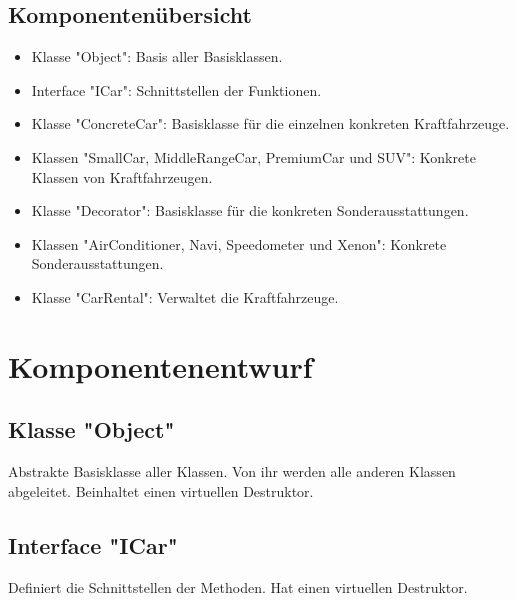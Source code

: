 \documentclass[12pt,a4paper]{article}
\begin{document}
\subsection {Komponentenübersicht}
\begin {itemize} 
	\item Klasse "Object":
	\newline
	Basis aller Basisklassen.
	
	\item Interface "ICar":
	\newline
	Schnittstellen der Funktionen.

	\item Klasse "ConcreteCar":
	\newline
	Basisklasse für die einzelnen konkreten Kraftfahrzeuge.

	\item Klassen "SmallCar, MiddleRangeCar, PremiumCar und SUV":
	\newline
	Konkrete Klassen von Kraftfahrzeugen.

	\item Klasse "Decorator":
	\newline
	Basisklasse für die konkreten Sonderausstattungen.
	
	\item Klassen "AirConditioner, Navi, Speedometer und Xenon":
	\newline
	Konkrete Sonderausstattungen.

	\item Klasse "CarRental":
	\newline
	Verwaltet die Kraftfahrzeuge.
			
\end {itemize}

\newpage
\section {Komponentenentwurf}
\subsection {Klasse "Object"}
Abstrakte Basisklasse aller Klassen. Von ihr werden alle anderen Klassen abgeleitet. Beinhaltet einen virtuellen Destruktor.

\subsection {Interface "ICar"}
Definiert die Schnittstellen der Methoden. Hat einen virtuellen Destruktor.
\\
\end{document}
